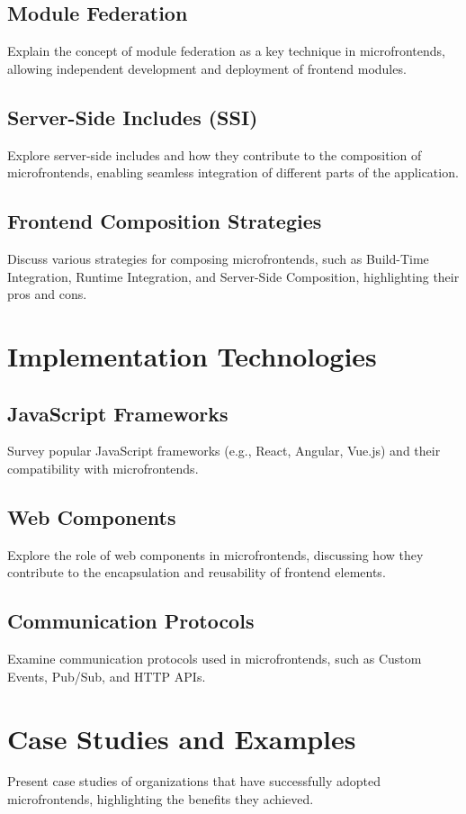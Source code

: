 \subsection{Module Federation}
Explain the concept of module federation as a key technique in microfrontends, allowing independent development and deployment of frontend modules.
\subsection{Server-Side Includes (SSI)}
Explore server-side includes and how they contribute to the composition of microfrontends, enabling seamless integration of different parts of the application.
\subsection{Frontend Composition Strategies}
Discuss various strategies for composing microfrontends, such as Build-Time Integration, Runtime Integration, and Server-Side Composition, highlighting their pros and cons.

\section{Implementation Technologies}
\subsection{JavaScript Frameworks}
Survey popular JavaScript frameworks (e.g., React, Angular, Vue.js) and their compatibility with microfrontends.
\subsection{Web Components}
Explore the role of web components in microfrontends, discussing how they contribute to the encapsulation and reusability of frontend elements.
\subsection{Communication Protocols}
Examine communication protocols used in microfrontends, such as Custom Events, Pub/Sub, and HTTP APIs.
\section{Case Studies and Examples}
Present case studies of organizations that have successfully adopted microfrontends, highlighting the benefits they achieved.